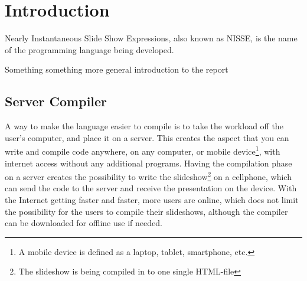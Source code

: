 \chapter{Introduction}
Nearly Instantaneous Slide Show Expressions, also known as NISSE, is the name of the programming language being developed.

Something something more general introduction to the report

\section{Server Compiler}
A way to make the language easier to compile is to take the workload off the user's computer, and place it on a server. This creates the aspect that you can write and compile code anywhere, on any computer, or mobile device\footnote{A mobile device is defined as a laptop, tablet, smartphone, etc.}, with internet access without any additional programs.
Having the compilation phase on a server creates the possibility to write the slideshow\footnote{The slideshow is being compiled in to one single HTML-file} on a cellphone, which can send the code to the server and receive the presentation on the device.
With the Internet getting faster and faster, more users are online, which does not limit the possibility for the users to compile their slideshows, although the compiler can be downloaded for offline use if needed.